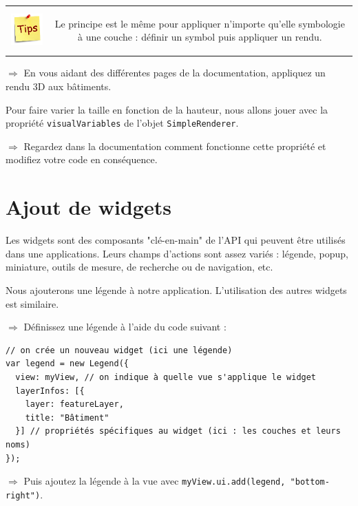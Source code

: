 \documentclass[11pt]{article}
\newcommand{\action}{$\Rightarrow$ }
\newenvironment{note}{%
	\begin{tabular}[t t]{c c}
		\includegraphics{img/tips.png}
		 &
		\begin{minipage}[c]{0.9\linewidth}
			\begin{sffamily}
}{%
			\end{sffamily}
		\end{minipage}
	\end{tabular}
}
\newcommand{\code}[1]{\lstinline{#1}}
\begin{document}
\begin{note}
Le principe est le même pour appliquer n'importe qu'elle symbologie à une couche : définir un symbol puis appliquer un rendu.
\end{note}

\action En vous aidant des différentes pages de la documentation, appliquez un rendu 3D aux bâtiments.

Pour faire varier la taille en fonction de la hauteur, nous allons jouer avec la propriété \code{visualVariables} de l'objet \code{SimpleRenderer}.

\action Regardez dans la documentation comment fonctionne cette propriété et modifiez votre code en conséquence.



\section{Ajout de widgets}
Les widgets sont des composants "clé-en-main" de l'API qui peuvent être utilisés dans une applications. Leurs champs d'actions sont assez variés : légende, popup, miniature, outils de mesure, de recherche ou de navigation, etc.

Nous ajouterons une légende à notre application. L'utilisation des autres widgets est similaire.

\action Définissez une légende à l'aide du code suivant :
\begin{lstlisting}
// on crée un nouveau widget (ici une légende)
var legend = new Legend({
  view: myView, // on indique à quelle vue s'applique le widget
  layerInfos: [{
    layer: featureLayer,
    title: "Bâtiment"
  }] // propriétés spécifiques au widget (ici : les couches et leurs noms)
});
\end{lstlisting}

\action Puis ajoutez la légende à la vue avec \code{myView.ui.add(legend, "bottom-right")}.
\end{document}
